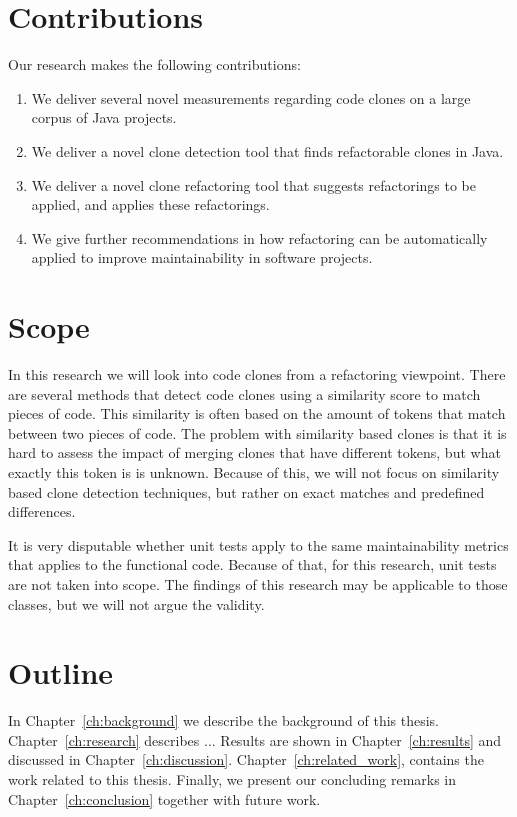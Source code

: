 \section{Contributions}
Our research makes the following contributions:
\begin{enumerate}
	\item We deliver several novel measurements regarding code clones on a large corpus of Java projects.
	\item We deliver a novel clone detection tool that finds refactorable clones in Java.
	\item We deliver a novel clone refactoring tool that suggests refactorings to be applied, and applies these refactorings.
	\item We give further recommendations in how refactoring can be automatically applied to improve maintainability in software projects.
\end{enumerate}

\section{Scope}
In this research we will look into code clones from a refactoring viewpoint. There are several methods that detect code clones using a similarity score to match pieces of code. This similarity is often based on the amount of tokens that match between two pieces of code. The problem with similarity based clones is that it is hard to assess the impact of merging clones that have different tokens, but what exactly this token is is unknown. Because of this, we will not focus on similarity based clone detection techniques, but rather on exact matches and predefined differences.

It is very disputable whether unit tests apply to the same maintainability metrics that applies to the functional code. Because of that, for this research, unit tests are not taken into scope. The findings of this research may be applicable to those classes, but we will not argue the validity.

\section{Outline}
In Chapter~\ref{ch:background} we describe the background of this thesis.
Chapter~\ref{ch:research} describes ...
Results are shown in Chapter~\ref{ch:results} and discussed in Chapter~\ref{ch:discussion}. Chapter~\ref{ch:related_work}, contains the work related to this thesis.
Finally, we present our concluding remarks in Chapter~\ref{ch:conclusion} together with future work.
